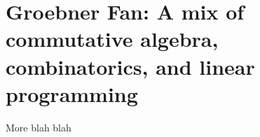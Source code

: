 \section{Groebner Fan: A mix of commutative algebra,
  combinatorics, and linear programming}

More blah blah

